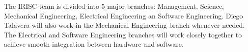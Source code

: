 The IRISC team is divided into 5 major branches: Management, Science, Mechanical Engineering, Electrical Engineering an Software Engineering. Diego Talavera will also work in the Mechanical Engineering branch whenever needed. The Electrical and Software Engineering branches will work closely together to achieve smooth integration between hardware and software.
